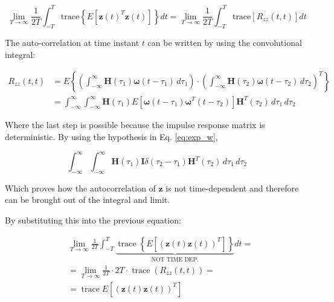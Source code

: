 \documentclass{scrreprt}
\begin{document}
\begin{equation}
    \lim_{T\rightarrow \infty} \frac{1}{2T} \int_{-T}^{T} \text{trace} \left\{ E \left[ \boldsymbol{z}(t)^T\boldsymbol{z}(t) \right] \right\} dt =\lim_{T\rightarrow \infty} \frac{1}{2T} \int_{-T}^{T} \text{trace} \left[ R_{zz}(t,t) \right] dt
\end{equation}

The auto-correlation at time instant $t$ can be written by using the convolutional integral:

\begin{equation}
    \begin{aligned}
        R_{zz}(t,t) &= E\left\{ \left( \int_{-\infty}^{\infty} \mathbf{H}(\tau_1) \boldsymbol{\omega}(t-\tau_1) \, d\tau_1 \right) \cdot \left( \int_{-\infty}^{\infty} \mathbf{H}(\tau_2) \boldsymbol{\omega}(t-\tau_2) \, d\tau_2 \right)^T \right\} \\
        &= \int_{-\infty}^{\infty} \int_{-\infty}^{\infty} \mathbf{H}(\tau_1) E \left[ \boldsymbol{\omega}(t-\tau_1) \boldsymbol{\omega}^T(t-\tau_2) \right] \mathbf{H}^T(\tau_2) \, d\tau_1 \, d\tau_2
    \end{aligned}
\end{equation}

Where the last step is possible because the impulse response matrix is deterministic. By using the hypothesis in Eq. \ref{eq:exp_w},

\begin{equation}
    \int_{-\infty}^{\infty} \int_{-\infty}^{\infty} \mathbf{H}(\tau_1) \mathbf{I} \delta(\tau_2 - \tau_1) \mathbf{H}^T(\tau_2) \, d\tau_1 \, d\tau_2
\end{equation}

Which proves how the autocorrelation of $\boldsymbol{z}$ is not time-dependent and therefore can be brought out of the integral and limit.

By substituting this into the previous equation:

\begin{align}
&\lim_{T\rightarrow \infty} \frac{1}{2T}  \int_{-T}^{T} \underbrace{ \operatorname{trace} \left\{ E \left[ (\mathbf{z}(t) \mathbf{z}(t))^T \right] \right\} }_{\text{NOT TIME DEP.}} dt = \\
&= \lim_{T\rightarrow \infty} \frac{1}{2T} \cdot 2T \cdot \operatorname{trace} (R_{zz}(t,t)) = \\[10pt]
&= \operatorname{trace} E \left[ (\mathbf{z}(t) \mathbf{z}(t))^T \right]
\end{align}
\end{document}
